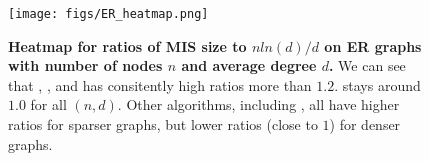 \begin{figure}[ht]
    \centering
    \texttt{[image: figs/ER\_heatmap.png]}
    \caption{\textbf{Heatmap for ratios of MIS size to $nln(d)/d$ on ER graphs with number of nodes $n$ and average degree $d$.} We can see that \redumis, \onlinemis, and \isco has consitently high ratios more than $1.2$. \rangreedy stays around $1.0$ for all $(n,d)$. Other algorithms, including \deggreedy, all have higher ratios for sparser graphs, but lower ratios (close to $1$) for denser graphs.}
    \label{fig:er_heatmap}
\end{figure}
